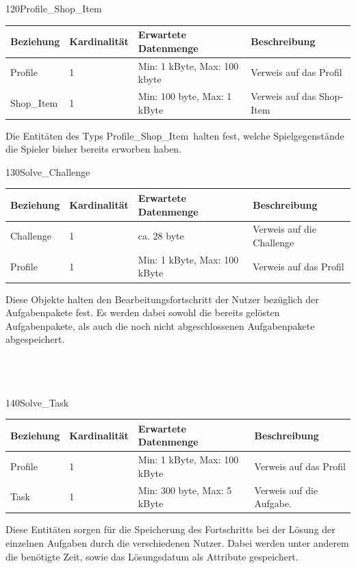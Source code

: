 \begin{entity}{120}{Profile\_Shop\_Item}
\begin{center}
	\begin{longtable}{|m{4cm}|m{}|m{}|m{}|}
 	 \hline
 	 \textbf{Beziehung} & \textbf{Kardinalität} &  \textbf{Erwartete Datenmenge} & \textbf{Beschreibung} \\
  	\hline
	Profile & 1  & Min: 1 kByte, Max: 100 kbyte & Verweis auf das Profil\\
	  \hline
  	Shop\_Item & 1  & Min: 100 byte, Max: 1 kByte & Verweis auf das Shop-Item\\
	  \hline
	\end{longtable}
\end{center}
Die Entitäten des Typs \glqq Profile\_Shop\_Item\grqq~halten fest, welche Spielgegenstände die Spieler bisher bereits erworben haben.
\end{entity}

\newpage
\begin{entity}{130}{Solve\_Challenge}
\begin{center}
	\begin{longtable}{|m{4cm}|m{}|m{}|m{}|}
 	 \hline
 	 \textbf{Beziehung} & \textbf{Kardinalität} &  \textbf{Erwartete Datenmenge} & \textbf{Beschreibung} \\
  	\hline
  	Challenge & 1  & ca. 28 byte & Verweis auf die Challenge\\
	  \hline
	Profile & 1  & Min: 1 kByte, Max: 100 kByte & Verweis auf das Profil\\
	  \hline
	\end{longtable}
\end{center}
Diese Objekte halten den Bearbeitungsfortschritt der Nutzer bezüglich der Aufgabenpakete fest. Es werden dabei sowohl die bereits gelösten Aufgabenpakete, als auch die noch nicht abgeschlossenen Aufgabenpakete abgespeichert.\\\\\\\
\end{entity}

\begin{entity}{140}{Solve\_Task}
\begin{center}
	\begin{longtable}{|m{4cm}|m{}|m{}|m{}|}
 	 \hline
 	 \textbf{Beziehung} & \textbf{Kardinalität} &  \textbf{Erwartete Datenmenge} & \textbf{Beschreibung} \\
  	\hline
	Profile & 1  & Min: 1 kByte, Max: 100 kByte &  Verweis auf das Profil\\
	  \hline
  	Task & 1  & Min: 300 byte, Max: 5 kByte & Verweis auf die Aufgabe.\\
	  \hline
	\end{longtable}
\end{center}
Diese Entitäten sorgen für die Speicherung des Fortschritts bei der Lösung der einzelnen Aufgaben durch die verschiedenen Nutzer. Dabei werden unter anderem die benötigte Zeit, sowie das Lösungsdatum als Attribute gespeichert.
\end{entity}

